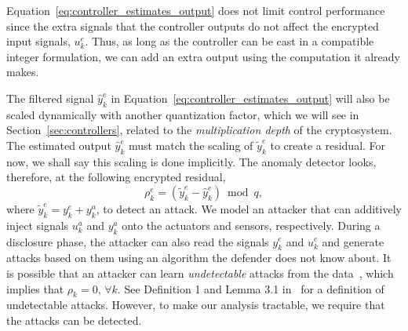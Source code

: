 \documentclass[journal, twoside, web]{ieeecolorpreprint}
\begin{document}
Equation~\ref{eq:controller_estimates_output} does not limit control performance since the extra signals that the controller outputs do not affect the encrypted input signals, $u_k^e$. Thus, as long as the controller can be cast in a compatible integer formulation, we can add an extra output using the computation it already makes.

The filtered signal $\hat y^e_k$ in Equation~\ref{eq:controller_estimates_output} will also be scaled dynamically with another quantization factor, which we will see in Section~\ref{sec:controllers}, related to the \emph{multiplication depth} of the cryptosystem. The estimated output $\hat y^e_k$ must match the scaling of $\tilde y^e_k$ to create a residual. For now, we shall say this scaling is done implicitly. %
The anomaly detector looks, therefore, at the following encrypted residual,
\begin{equation}\label{eq:encrypted_residual} 
    \rho_k^e = (\tilde y^e_k-\hat{y}_k^e) \bmod q,
\end{equation}
where $\tilde y_k^e =  y^e_k+y^a_k$, to detect an attack. %
We model an attacker that can additively inject signals $u^a_k$ and $y^a_k$ onto the actuators and sensors, respectively. During a disclosure phase, the attacker can also read the signals $y^e_k$ and $u^e_k$ and generate attacks based on them using an algorithm the defender does not know about. It is possible that an attacker can learn \emph{undetectable} attacks from the data~\cite{taheri2021,alisic2021ecc}, which implies that $\rho_k=0, \, \forall k$. See Definition 1 and Lemma 3.1 in~\cite{Pasqualetti2013} for a definition of undetectable attacks. However, to make our analysis tractable, we require that the attacks can be detected.
\end{document}
